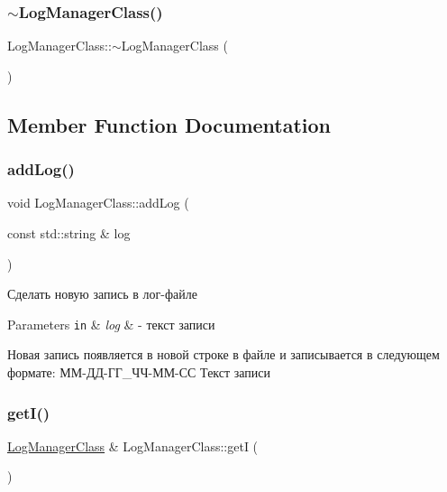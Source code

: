 \subsubsection{\texorpdfstring{$\sim$\+Log\+Manager\+Class()}{~LogManagerClass()}}
{\footnotesize\ttfamily Log\+Manager\+Class\+::$\sim$\+Log\+Manager\+Class (\begin{DoxyParamCaption}{ }\end{DoxyParamCaption})\hspace{0.3cm}{\ttfamily [private]}}



\subsection{Member Function Documentation}
\mbox{\label{class_log_manager_class_a03111f2a8bd4236efb8d2defc5c32dca}} 
\subsubsection{\texorpdfstring{add\+Log()}{addLog()}}
{\footnotesize\ttfamily void Log\+Manager\+Class\+::add\+Log (\begin{DoxyParamCaption}\item[{const std\+::string \&}]{log }\end{DoxyParamCaption})}



Сделать новую запись в лог-\/файле 


\begin{DoxyParams}[1]{Parameters}
\mbox{\tt in}  & {\em log} & -\/ текст записи\\
\hline
\end{DoxyParams}
Новая запись появляется в новой строке в файле и записывается в следующем формате\+: ММ-\/ДД-\/ГГ\+\_\+ЧЧ-\/ММ-\/СС Текст записи \mbox{\label{class_log_manager_class_a30c4fbd4107f522daa4a0952ce095e6c}} 
\subsubsection{\texorpdfstring{get\+I()}{getI()}}
{\footnotesize\ttfamily \hyperlink{class_log_manager_class}{Log\+Manager\+Class} \& Log\+Manager\+Class\+::getI (\begin{DoxyParamCaption}{ }\end{DoxyParamCaption})\hspace{0.3cm}{\ttfamily [static]}}



